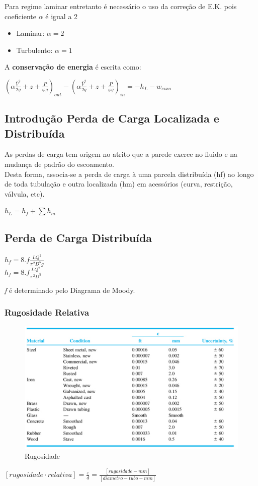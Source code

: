 \documentclass[a4paper, 12pt]{article}
\begin{document}
	Para regime laminar entretanto é necessário o uso da correção de E.K. pois coeficiente $\alpha$ é igual a 2 
	
	\begin{itemize}
		\item Laminar: $\alpha = 2$
		\item Turbulento: $\alpha = 1$	
	\end{itemize}

	A \textbf{conservação de energia} é escrita como:
	\begin{center}
		\Large
		$
		(\alpha \frac{\bar{V}^2}{2g} + z + \frac{P}{\varphi g})_{out} - (\alpha \frac{\bar{V}^2}{2g} + z + \frac{P}{\varphi g})_{in} = -h_L - w_{eixo}
		$
	\end{center}

\subsection{Introdução Perda de Carga Localizada e Distribuída}
	As perdas de carga tem origem no atrito que a parede exerce no fluido e na mudança de padrão do escoamento.\\
	 
	Desta forma, associa-se a perda de carga à uma parcela distribuída (hf) ao longo de toda tubulação e outra localizada (hm) em acessórios (curva, restrição, válvula, etc).
	\begin{center}
		\Large
		$
		h_{L} = h_{f} + \sum h_m
		$
	\end{center}



\newpage
\subsection{Perda de Carga Distribuída}
	\begin{center}
		\Large
		$
		h_{f} = 8.f\frac{LQ^2}{\pi^2D^5g}
		$\\$
		h_{f} = 8.f\frac{LQ^2}{\pi^2D^5}
		$
	\end{center}
	\textit{f} é determinado pelo Diagrama de Moody.
\subsubsection{Rugosidade Relativa}
	\begin{figure}[h]
		\centering
		\includegraphics[width=0.7\linewidth]{imagens/rug}
		\caption{Rugosidade}
		\label{fig:rug}
	\end{figure}
	\begin{center}
		\Large
		$
		[rugosidade\cdot relativa] = \frac{\varepsilon}{d} = \frac{[rugosidade-mm]}{[diametro-tubo-mm]}
		$
	\end{center}
\end{document}

